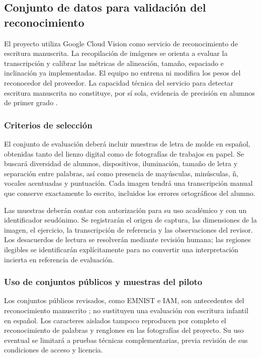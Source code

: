 \subsection{Conjunto de datos para validación del reconocimiento}
\label{sec:datos-validacion}

El proyecto utiliza Google Cloud Vision como servicio de reconocimiento de escritura manuscrita. La recopilación de imágenes se orienta a evaluar la transcripción y calibrar las métricas de alineación, tamaño, espaciado e inclinación ya implementadas. El equipo no entrena ni modifica los pesos del reconocedor del proveedor. La capacidad técnica del servicio para detectar escritura manuscrita no constituye, por sí sola, evidencia de precisión en alumnos de primer grado \cite{googlevisionHandwriting}.

\subsubsection{Criterios de selección}
El conjunto de evaluación deberá incluir muestras de letra de molde en español, obtenidas tanto del lienzo digital como de fotografías de trabajos en papel. Se buscará diversidad de alumnos, dispositivos, iluminación, tamaño de letra y separación entre palabras, así como presencia de mayúsculas, minúsculas, ñ, vocales acentuadas y puntuación. Cada imagen tendrá una transcripción manual que conserve exactamente lo escrito, incluidos los errores ortográficos del alumno.

Las muestras deberán contar con autorización para su uso académico y con un identificador seudónimo. Se registrarán el origen de captura, las dimensiones de la imagen, el ejercicio, la transcripción de referencia y las observaciones del revisor. Los desacuerdos de lectura se resolverán mediante revisión humana; las regiones ilegibles se identificarán explícitamente para no convertir una interpretación incierta en referencia de evaluación.

\subsubsection{Uso de conjuntos públicos y muestras del piloto}
Los conjuntos públicos revisados, como EMNIST e IAM, son antecedentes del reconocimiento manuscrito \cite{cohen2017emnist,marti2002iam}; no sustituyen una evaluación con escritura infantil en español. Los caracteres aislados tampoco reproducen por completo el reconocimiento de palabras y renglones en las fotografías del proyecto. Su uso eventual se limitará a pruebas técnicas complementarias, previa revisión de sus condiciones de acceso y licencia.

